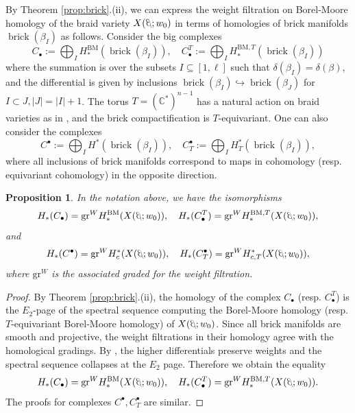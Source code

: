 \documentclass[10pt]{amsart}
\theoremstyle{plain}
\newtheorem{prop}[thm]{Proposition}
\theoremstyle{definition}
\theoremstyle{remark}
\numberwithin{equation}{section}
\newcommand{\BM}{\mathrm{BM}}
\newcommand{\brick}{\operatorname{brick}}
\DeclareRobustCommand{\ateb}{\text{\reflectbox{$\beta$}}}
\begin{document}

	
\noindent By Theorem \ref{prop:brick}.(ii), we can express the weight filtration on Borel-Moore homology of the braid variety $X(\ateb;w_0)$ in terms of homologies of brick manifolds %
$\brick(\beta_I)$ as follows. Consider the big complexes
$$C_{\bullet}:=\bigoplus_{I}H^{\BM}_*(\brick(\beta_I)),\quad
C_{\bullet}^T:=\bigoplus_{I}H_*^{\BM,T}(\brick(\beta_I))
$$
where the summation is over the subsets $I \subseteq [1, \ell]$ such that $\delta(\beta_I)=\delta(\beta)$, and the differential is given by inclusions $\brick(\beta_I) \hookrightarrow \brick(\beta_J)$
for $I\subset J,|J|=|I|+1$. The torus $T=(\mathbb{C}^*)^{n-1}$ has a natural action on braid varieties as in \cite[Section 2.2]{CGGS}, and the brick compactification is $T$-equivariant.
One can also consider the complexes 
$$C^{\bullet}:=\bigoplus_{I}H^*(\brick(\beta_I)),\quad
C^{\bullet}_T:=\bigoplus_{I}H^*_T(\brick(\beta_I)),
$$
where all inclusions of brick manifolds correspond to maps in cohomology (resp. equivariant cohomology) in the opposite direction.


\begin{prop}\label{prop:homology_braid}
In the notation above, we have the isomorphisms
$$	H_*(C_{\bullet})=\mathrm{gr}^{W}H^{\BM}_*(X(\ateb;w_0)),\quad 
H_*(C_{\bullet}^T)=\mathrm{gr}^{W}H_*^{\BM,T}(X(\ateb;w_0)),
$$
and
$$
H_*(C^{\bullet})=\mathrm{gr}^{W}H_{c}^*(X(\ateb;w_0)),\quad 
H_*(C^{\bullet}_T)=\mathrm{gr}^{W}H^*_{c,T}(X(\ateb;w_0)),
$$
where $\mathrm{gr}^{W}$  is the associated graded for the weight filtration.\\
\end{prop}

\begin{proof}
By Theorem \ref{prop:brick}.(ii), the homology of the complex $C_{\bullet}$ (resp. $C_{\bullet}^T$) is the $E_2$-page of the spectral sequence computing the Borel-Moore homology (resp. $T$-equivariant Borel-Moore homology) of $X(\ateb;w_0)$. Since all brick manifolds are smooth and projective, the weight filtrations in their homology agree with the homological gradings. By \cite{D,D2}, the higher differentials preserve weights and the spectral sequence collapses at the $E_2$ page. Therefore we obtain the equality
	$$
	H_*(C_{\bullet})=\mathrm{gr}^{W}H^{\BM}_*(X(\ateb;w_0)),\quad H_*(C_{\bullet}^T)=\mathrm{gr}^{W}H_*^{\BM,T}(X(\ateb;w_0)).
	$$
The proofs for complexes $C^{\bullet},C^{\bullet}_T$ are similar.    
\end{proof}
\end{document}
